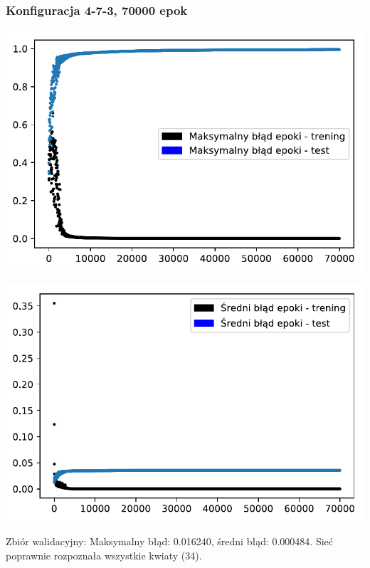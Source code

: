 \documentclass{classrep}
\begin{document}
\subsubsection{Konfiguracja 4-7-3, 70000 epok}
\begin{center}
  \includegraphics{output_0_3.pdf}
\end{center}
\begin{center}
  \includegraphics{output_0_4.pdf}
\end{center}

Zbiór walidacyjny: Maksymalny błąd: 0.016240, średni błąd: 0.000484.
Sieć poprawnie rozpoznała wszystkie kwiaty (34).
\end{document}
